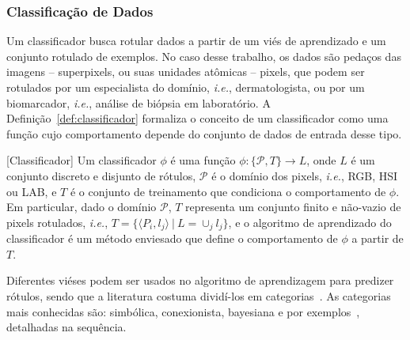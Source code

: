 \subsubsection{Classificação de Dados}

Um classificador busca rotular dados a partir de um viés de aprendizado e um conjunto rotulado de exemplos.
No caso desse trabalho, os dados são pedaços das imagens -- superpixels, ou suas unidades atômicas -- pixels, que podem ser rotulados por um especialista do domínio, \textit{i.e.}, dermatologista, ou por um biomarcador, \textit{i.e.}, análise de biópsia em laboratório.
A Definição~\ref{def:classificador} formaliza o conceito de um classificador como uma função cujo comportamento depende do conjunto de dados de entrada desse tipo.

\begin{definition}\label{def:classificador}[Classificador]
Um classificador $\phi$ é uma função $\phi : \{\mathcal{P}, T\} \rightarrow L$, onde $L$ é um conjunto discreto e disjunto de rótulos, $\mathcal{P}$ é o domínio dos pixels, \textit{i.e.}, RGB, HSI ou LAB, e $T$ é o conjunto de treinamento que condiciona o comportamento de $\phi$.
Em particular, dado o domínio $\mathcal{P}$, $T$ representa um conjunto finito e não-vazio de pixels rotulados, \textit{i.e.}, $T = \{\langle P_i, l_j \rangle~|~L = \cup_j l_j\}$, e o algoritmo de aprendizado do classificador é um método enviesado que define o comportamento de $\phi$ a partir de $T$.
\end{definition}

Diferentes viéses podem ser usados no algoritmo de aprendizagem para predizer rótulos, sendo que a literatura costuma dividí-los em categorias~\cite{Faceli2008}.
As categorias mais conhecidas são: simbólica, conexionista, bayesiana e por exemplos~\cite{Domingos2015,Bradley1997}, detalhadas na sequência. 

